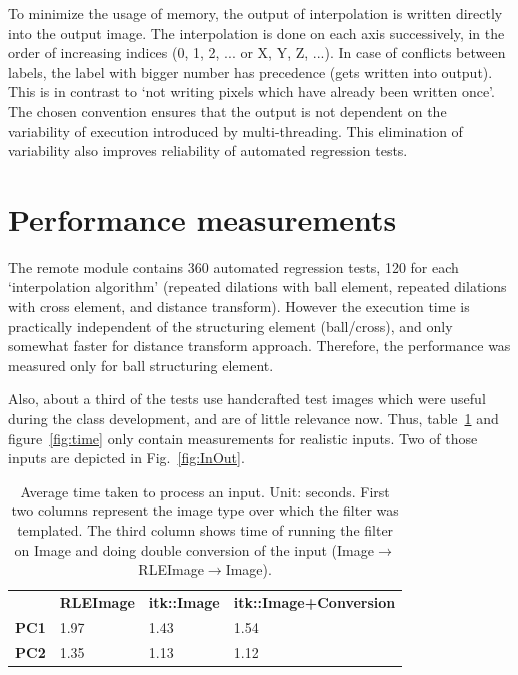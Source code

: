 \documentclass{InsightArticle}
\begin{document}
To minimize the usage of memory, the output of interpolation is written
directly into the output image.
The interpolation is done on each axis successively,
in the order of increasing indices (0, 1, 2, ... or X, Y, Z, ...).
In case of conflicts between labels,
the label with bigger number has precedence (gets written into output).
This is in contrast to `not writing pixels which have already been written once'.
The chosen convention ensures that the output is not dependent on the
variability of execution introduced by multi-threading.
This elimination of variability also improves
reliability of automated regression tests.


\section{Performance measurements}

The remote module%
contains 360 automated regression tests, 120 for each `interpolation algorithm'
(repeated dilations with ball element, repeated dilations with cross element, and distance transform).
However the execution time is practically independent of the structuring element (ball/cross),
and only somewhat faster for distance transform approach.
Therefore, the performance was measured only for ball structuring element.

Also, about a third of the tests use handcrafted test images
which were useful during the class development, and are of little relevance now.
Thus, table~\ref{tab:time} and figure~\ref{fig:time} only contain measurements for realistic inputs.
Two of those inputs are depicted in Fig.~\ref{fig:InOut}.

\begin{table}[hbt]
	\centering
		\begin{tabular}{llll}
								 & \textbf{RLEImage} & \textbf{itk::Image} & \textbf{itk::Image+Conversion} \\
		\textbf{PC1} & 1.97              & 1.43                & 1.54                           \\
		\textbf{PC2} & 1.35              & 1.13                & 1.12                          
		\end{tabular}
	\caption{Average time taken to process an input. Unit: seconds.
	First two columns represent the image type over which the filter was templated.
	The third column shows time of running the filter on Image
	and doing double conversion of the input (Image$\rightarrow$RLEImage$\rightarrow$Image).}
	\label{tab:time}
\end{table}
\end{document}
